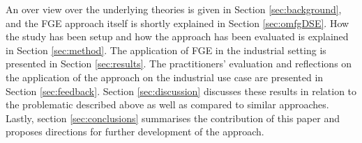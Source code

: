 \documentclass[aerospace,article,submit,moreauthors,pdftex]{Definitions/mdpi}
\newcommand{\Jakob}[1]{{{\color{orange}{\itshape{#1}}\color{black}}
    }{\ignorespaces}}
\begin{document}

An over view over the underlying theories is given in Section \ref{sec:background}, and the \ac{FGE} approach itself is shortly explained in Section \ref{sec:omfgDSE}.
How the study has been setup and how the approach has been evaluated is explained in Section \ref{sec:method}.
The application of \ac{FGE} in the industrial setting is presented in Section \ref{sec:results}. 
The practitioners' evaluation and reflections on the application of the approach on the industrial use case  are presented in Section \ref{sec:feedback}.
Section \ref{sec:discussion} discusses these results in relation to the problematic described above as well as compared to similar approaches.
Lastly, section \ref{sec:conclusions} summarises the contribution of this paper and proposes directions for further development of the approach.







\end{document}
